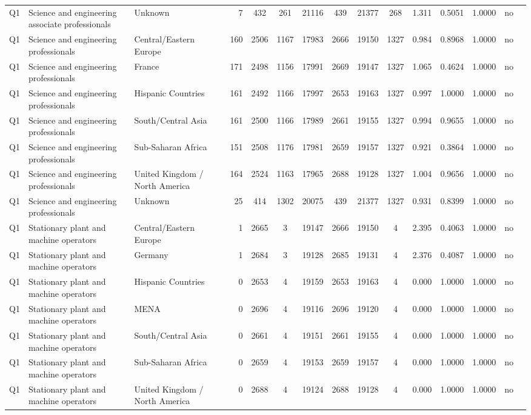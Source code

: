 \begin{longtable}{lllrcccccccccll}
Q1 & Science and engineering associate professionals & Unknown & 7 & 432 & 261 & 21116 & 439 & 21377 & 268 & 1.311 & 0.5051 & 1.0000 & no \\
Q1 & Science and engineering professionals & Central/Eastern Europe & 160 & 2506 & 1167 & 17983 & 2666 & 19150 & 1327 & 0.984 & 0.8968 & 1.0000 & no \\
Q1 & Science and engineering professionals & France & 171 & 2498 & 1156 & 17991 & 2669 & 19147 & 1327 & 1.065 & 0.4624 & 1.0000 & no \\
Q1 & Science and engineering professionals & Hispanic Countries & 161 & 2492 & 1166 & 17997 & 2653 & 19163 & 1327 & 0.997 & 1.0000 & 1.0000 & no \\
Q1 & Science and engineering professionals & South/Central Asia & 161 & 2500 & 1166 & 17989 & 2661 & 19155 & 1327 & 0.994 & 0.9655 & 1.0000 & no \\
Q1 & Science and engineering professionals & Sub-Saharan Africa & 151 & 2508 & 1176 & 17981 & 2659 & 19157 & 1327 & 0.921 & 0.3864 & 1.0000 & no \\
Q1 & Science and engineering professionals & United Kingdom / North America & 164 & 2524 & 1163 & 17965 & 2688 & 19128 & 1327 & 1.004 & 0.9656 & 1.0000 & no \\
Q1 & Science and engineering professionals & Unknown & 25 & 414 & 1302 & 20075 & 439 & 21377 & 1327 & 0.931 & 0.8399 & 1.0000 & no \\
Q1 & Stationary plant and machine operators & Central/Eastern Europe & 1 & 2665 & 3 & 19147 & 2666 & 19150 & 4 & 2.395 & 0.4063 & 1.0000 & no \\
Q1 & Stationary plant and machine operators & Germany & 1 & 2684 & 3 & 19128 & 2685 & 19131 & 4 & 2.376 & 0.4087 & 1.0000 & no \\
Q1 & Stationary plant and machine operators & Hispanic Countries & 0 & 2653 & 4 & 19159 & 2653 & 19163 & 4 & 0.000 & 1.0000 & 1.0000 & no \\
Q1 & Stationary plant and machine operators & MENA & 0 & 2696 & 4 & 19116 & 2696 & 19120 & 4 & 0.000 & 1.0000 & 1.0000 & no \\
Q1 & Stationary plant and machine operators & South/Central Asia & 0 & 2661 & 4 & 19151 & 2661 & 19155 & 4 & 0.000 & 1.0000 & 1.0000 & no \\
Q1 & Stationary plant and machine operators & Sub-Saharan Africa & 0 & 2659 & 4 & 19153 & 2659 & 19157 & 4 & 0.000 & 1.0000 & 1.0000 & no \\
Q1 & Stationary plant and machine operators & United Kingdom / North America & 0 & 2688 & 4 & 19124 & 2688 & 19128 & 4 & 0.000 & 1.0000 & 1.0000 & no \\

\end{longtable}
